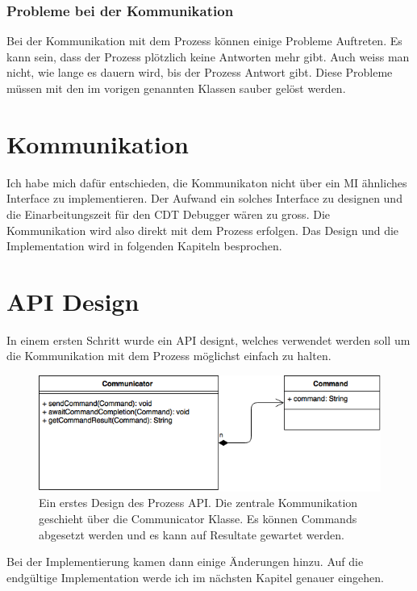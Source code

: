 \subsubsection{Probleme bei der Kommunikation}

Bei der Kommunikation mit dem Prozess können einige Probleme Auftreten. Es kann sein, dass der Prozess plötzlich keine Antworten mehr gibt. Auch weiss man nicht, wie lange es dauern wird, bis der Prozess Antwort gibt. Diese Probleme müssen mit den im vorigen genannten Klassen sauber gelöst werden.

\section{Kommunikation}

Ich habe mich dafür entschieden, die Kommunikaton nicht über ein MI ähnliches Interface zu implementieren. Der Aufwand ein solches Interface zu designen und die Einarbeitungszeit für den CDT Debugger wären zu gross. Die Kommunikation wird also direkt mit dem Prozess erfolgen. Das Design und die Implementation wird in folgenden Kapiteln besprochen.


\section{API Design}

In einem ersten Schritt wurde ein API designt, welches verwendet werden soll um die Kommunikation mit dem Prozess möglichst einfach zu halten.

\begin{figure}[H]
	\centering
		\includegraphics[scale=0.5]{forthcommunication/api.png}
		\caption{Ein erstes Design des Prozess API. Die zentrale Kommunikation geschieht über die Communicator Klasse. Es können Commands abgesetzt werden und es kann auf Resultate gewartet werden.}
		\label{fig:extensionpoint}
\end{figure}

Bei der Implementierung kamen dann einige Änderungen hinzu. Auf die endgültige Implementation werde ich im nächsten Kapitel genauer eingehen.

